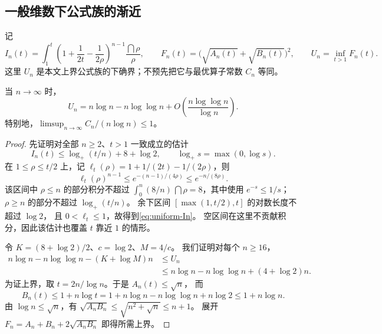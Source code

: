 \subsection{一般维数下公式族的渐近}
记
\[
 I_n(t)=\int_1^t\left(1+\frac1{2t}-\frac1{2\rho}\right)^{n-1}
                 \frac{\dint\rho}{\rho},\qquad
 F_n(t)=\bigl(\sqrt{A_n(t)}+\sqrt{B_n(t)}\bigr)^2,
 \qquad U_n=\inf_{t>1}F_n(t).
\]
这里 $U_n$ 是本文上界公式族的下确界；不预先把它与最优算子常数 $C_n$ 等同。
\begin{proposition}\label{prop:family-asymptotic}
当 $n\to\infty$ 时，
\[
 U_n=n\log n-n\log\log n+
 O\left(\frac{n\log\log n}{\log n}\right).
\]
特别地，$\limsup_{n\to\infty}C_n/(n\log n)\le1$。
\end{proposition}
\begin{proof}
先证明对全部 $n\ge2$、$t>1$ 一致成立的估计
\begin{equation}\label{eq:uniform-In}
 I_n(t)\le\log_+(t/n)+8+\log2,
 \qquad \log_+s=\max(0,\log s).
\end{equation}
在 $1\le\rho\le t/2$ 上，记
$\ell_t(\rho)=1+1/(2t)-1/(2\rho)$，则
\[
 \ell_t(\rho)^{n-1}\le
 e^{-(n-1)/(4\rho)}\le e^{-n/(8\rho)}.
\]
该区间中 $\rho\le n$ 的部分积分不超过
$\int_0^n(8/n)\,\dint\rho=8$，其中使用 $e^{-s}\le1/s$；
$\rho\ge n$ 的部分不超过 $\log_+(t/n)$。
余下区间 $[\max(1,t/2),t]$ 的对数长度不超过 $\log2$，
且 $0<\ell_t\le1$，故得到\eqref{eq:uniform-In}。
空区间在这里不贡献积分，因此该估计也覆盖 $t$ 靠近 $1$ 的情形。

令 $K=(8+\log2)/2$、$c=\log2$、$M=4/c$。
我们证明对每个 $n\ge16$，
\begin{equation}\label{eq:explicit-family-asymptotic}
 \begin{split}
 n\log n-n\log\log n-(K+\log M)n
 &\le U_n\\
 &\le n\log n-n\log\log n+(4+\log2)n.
 \end{split}
\end{equation}
为证上界，取 $t=2n/\log n$。于是 $A_n(t)\le\sqrt n$，
而
\[
 B_n(t)\le1+n\log t
 =1+n\log n-n\log\log n+n\log2
 \le1+n\log n.
\]
由 $\log n\le\sqrt n$，有
$\sqrt{A_nB_n}\le\sqrt{n^2+\sqrt n}\le n+1$。
展开 $F_n=A_n+B_n+2\sqrt{A_nB_n}$ 即得所需上界。


\end{proof}
